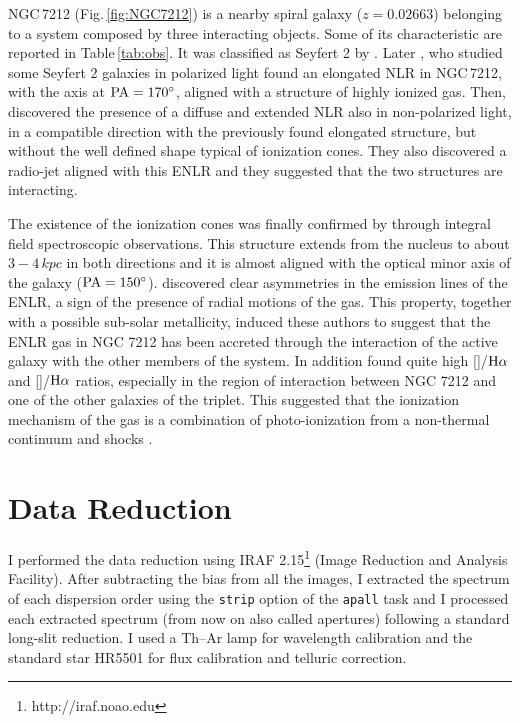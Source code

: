 \documentclass[../main.tex]{subfiles}
\begin{document}
NGC\,7212 (Fig.\,\ref{fig:NGC7212}) is a nearby spiral galaxy ($z=0.02663$) belonging to a system composed by three interacting objects.
Some of its characteristic are reported in Table\,\ref{tab:obs}.
It was classified as Seyfert 2 by \citet{Wasilewski81}.
Later \citet{Tran95}, who studied some Seyfert 2 galaxies in polarized light found an elongated NLR in NGC\,7212, with the axis at $\rm PA=\ang{170}$, aligned with a structure of highly ionized gas.
Then, \citet{Falcke98} discovered the presence of a diffuse and extended NLR also in non-polarized light, in a compatible direction with the previously found elongated structure, but without the well defined shape typical of ionization cones.
They also discovered a radio-jet aligned with this ENLR and they suggested that the two structures are interacting.

The existence of the ionization cones was finally confirmed by \citet{Cracco11} through integral field spectroscopic observations.
This structure extends from the nucleus to about $3-4\,\si{kpc}$ in both directions and it is almost aligned with the optical minor axis of the galaxy ($\rm PA=\ang{150}$).
\citet{Cracco11} discovered clear asymmetries in the emission lines of the ENLR, a sign of the presence of radial motions of the gas. 
This property, together with a possible sub-solar metallicity, induced these authors to suggest that the ENLR gas in NGC 7212 has been accreted through the interaction of the active galaxy with the other members of the system. 
In addition \citet{Cracco11} found quite high []/$\rm H\alpha$ and []/$\rm H\alpha$ ratios, especially in the region of interaction between NGC 7212 and one of the other galaxies of the triplet. 
This suggested that the ionization mechanism of the gas is a combination of photo-ionization from a non-thermal continuum and shocks \citep{Contini12}.
 

\section{Data Reduction}
\label{sec:datared}

I performed the data reduction using IRAF 2.15\footnote{http://iraf.noao.edu} (Image Reduction and Analysis Facility).
After subtracting the bias from all the images, I extracted the spectrum of each dispersion order using the \verb!strip! option of the \verb!apall! task and I processed each extracted spectrum (from now on also called apertures) following a standard long-slit reduction.
I used a Th--Ar lamp for wavelength calibration and the standard star HR5501 for flux calibration and telluric correction.
\end{document}
